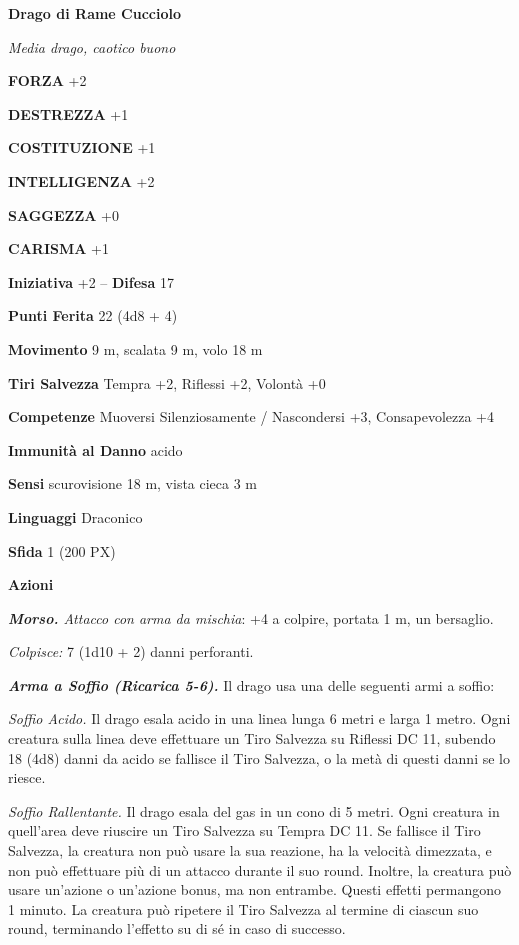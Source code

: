 \begin{multicols}{2}
\medskip\textbf{Drago di Rame Cucciolo}

\textit{Media drago, caotico buono}

\textbf{FORZA} +2

\textbf{DESTREZZA} +1

\textbf{COSTITUZIONE} +1

\textbf{INTELLIGENZA} +2

\textbf{SAGGEZZA} +0

\textbf{CARISMA} +1

\textbf{Iniziativa} +2 -- \textbf{Difesa} 17

\textbf{Punti Ferita} 22 (4d8 + 4)

\textbf{Movimento} 9 m, scalata 9 m, volo 18 m

\textbf{Tiri Salvezza} Tempra +2, Riflessi +2, Volontà +0

\textbf{Competenze} Muoversi Silenziosamente / Nascondersi +3, Consapevolezza +4

\textbf{Immunità al Danno} acido

\textbf{Sensi} scurovisione 18 m, vista cieca 3 m

\textbf{Linguaggi} Draconico

\textbf{Sfida} 1 (200 PX)

\textbf{Azioni}

\textit{\textbf{Morso.} Attacco con arma da mischia}: +4 a colpire, portata 1 m, un bersaglio.

\textit{Colpisce:} 7 (1d10 + 2) danni perforanti.

\textit{\textbf{Arma a Soffio (Ricarica 5-6).}} Il drago usa una delle seguenti armi a soffio:

\textit{Soffio Acido.} Il drago esala acido in una linea lunga 6 metri e larga 1 metro. Ogni creatura sulla linea deve effettuare un Tiro Salvezza su Riflessi DC 11, subendo 18 (4d8) danni da acido se fallisce il Tiro Salvezza, o la metà di questi danni se lo riesce.

\textit{Soffio Rallentante.} Il drago esala del gas in un cono di 5 metri. Ogni creatura in quell'area deve riuscire un Tiro Salvezza su Tempra DC 11. Se fallisce il Tiro Salvezza, la creatura non può usare la sua reazione, ha la velocità dimezzata, e non può effettuare più di un attacco durante il suo round. Inoltre, la creatura può usare un'azione o un'azione bonus, ma non entrambe. Questi effetti permangono 1 minuto. La creatura può ripetere il Tiro Salvezza al termine di ciascun suo round, terminando l'effetto su di sé in caso di successo.


\end{multicols}
